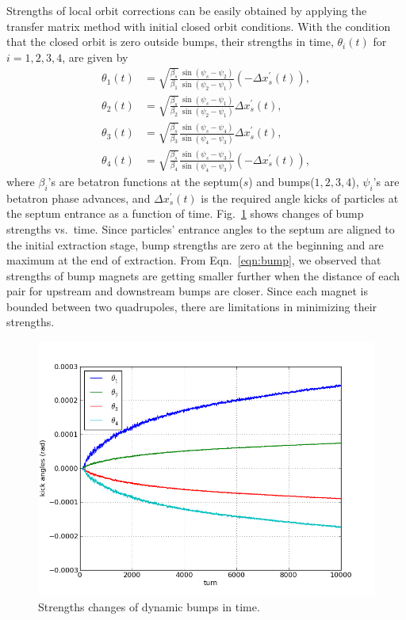 \documentclass[aps,prstab,onecolumn,preprint,endfloats,11pt]{revtex4-1}
\begin{document}
Strengths of local orbit corrections can be easily obtained by applying the transfer matrix method with initial closed orbit conditions.
With the condition that the closed orbit is zero outside bumps, their strengths in time, $\theta_{i}(t)$ for $i=1,2,3,4$, are given by
\begin{equation}
  \begin{split}
  \theta_{1}(t) & = \sqrt{\frac{\beta_{s}}{\beta_{1}}}
               \frac{\sin(\psi_{s} - \psi_{2})}
                    {\sin(\psi_{2} - \psi_{1})}
               \left( - \Delta x_{s}^{\prime} (t) \right),
  \\ %
  \theta_{2}(t) & = \sqrt{\frac{\beta_{s}}{\beta_{2}}}
               \frac{\sin(\psi_{s} - \psi_{1})}
                    {\sin(\psi_{2} - \psi_{1})}
               \Delta x_{s}^{\prime} (t), \\
  \theta_{3}(t) & = \sqrt{\frac{\beta_{s}}{\beta_{3}}}
               \frac{\sin(\psi_{s} - \psi_{4})}
                    {\sin(\psi_{4} - \psi_{3})}
               \Delta x_{s}^{\prime} (t),
  \\ %
  \theta_{4}(t) & = \sqrt{\frac{\beta_{s}}{\beta_{4}}}
               \frac{\sin(\psi_{s} - \psi_{3})}
                    {\sin(\psi_{4} - \psi_{3})}
               \left( - \Delta x_{s}^{\prime} (t) \right),
  \end{split}
  \label{eqn:bump}
\end{equation}
where $\beta_{i}$'s are betatron functions at the septum($s$) and bumps($1,2,3,4$), $\psi_{i}$'s are betatron phase advances, and $\Delta x^{\prime}_{s} (t)$ is the required angle kicks of particles at the septum entrance as a function of time.
Fig.~\ref{fig:bump2} shows changes of bump strengths vs.~time.
Since particles' entrance angles to the septum are aligned to the initial extraction stage, bump strengths are zero at the beginning and are maximum at the end of extraction.
From Eqn.~\ref{eqn:bump}, we observed that strengths of bump magnets are getting smaller further when the distance of each pair for upstream and downstream bumps are closer.
Since each magnet is bounded between two quadrupoles, there are limitations in minimizing their strengths.

\begin{figure}[!tbp]
  \includegraphics[width=.45\textwidth]{img/20140123-00.png}
  \caption{\label{fig:bump2}Strengths changes of dynamic bumps in time.}
\end{figure}
\end{document}
